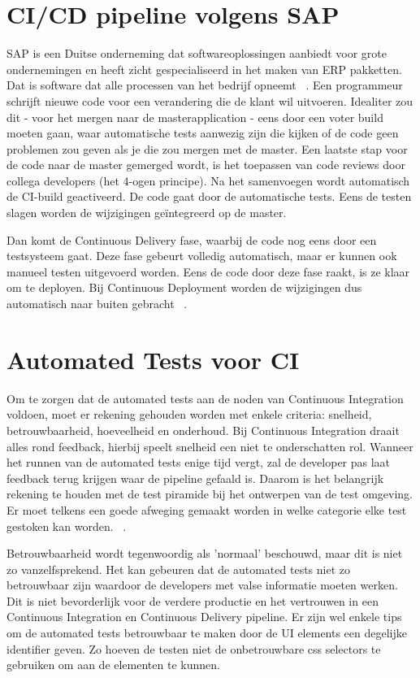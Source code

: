 \section{CI/CD pipeline volgens SAP}
\label{sec:ci-cd-pipeling-volgens-sap}
SAP is een Duitse onderneming dat softwareoplossingen aanbiedt voor grote ondernemingen en heeft zicht gespecialiseerd in het maken van ERP pakketten. Dat is software dat alle processen van het bedrijf opneemt ~\autocite{SAPERP2019}.
Een programmeur schrijft nieuwe code voor een verandering die de klant wil uitvoeren. Idealiter zou dit - voor het mergen naar de masterapplication - eens door een voter build moeten gaan, waar automatische tests aanwezig zijn die kijken of de code geen problemen zou geven als je die zou mergen met de master. Een laatste stap voor de code naar de master gemerged wordt, is het toepassen van code reviews door collega developers (het 4-ogen principe).
Na het samenvoegen wordt automatisch de CI-build geactiveerd. De code gaat door de automatische tests. Eens de testen slagen worden de wijzigingen geïntegreerd op de master. 

Dan komt de Continuous Delivery fase, waarbij de code nog eens door een testsysteem gaat. Deze fase gebeurt volledig automatisch, maar er kunnen ook manueel testen uitgevoerd worden. Eens de code door deze fase raakt, is ze klaar om te deployen. 
Bij Continuous Deployment worden de wijzigingen dus automatisch naar buiten gebracht ~\autocite{Kramer2018}.

\section{Automated Tests voor CI}
\label{sec:automated-test-voor-ci}
Om te zorgen dat de automated tests aan de noden van Continuous Integration voldoen, moet er rekening gehouden worden met enkele criteria: snelheid, betrouwbaarheid, hoeveelheid en onderhoud.
Bij Continuous Integration draait alles rond feedback, hierbij speelt snelheid een niet te onderschatten rol. Wanneer het runnen van de automated tests enige tijd vergt, zal de developer pas laat feedback terug krijgen waar de pipeline gefaald is. Daarom is het belangrijk rekening te houden met de test piramide bij het ontwerpen van de test omgeving. Er moet telkens een goede afweging gemaakt worden in welke categorie elke test gestoken kan worden.
~\autocite{Jones2019}.

Betrouwbaarheid wordt tegenwoordig als 'normaal' beschouwd, maar dit is niet zo vanzelfsprekend. Het kan gebeuren dat de automated tests niet zo betrouwbaar zijn waardoor de developers met valse informatie moeten werken. Dit is niet bevorderlijk voor de verdere productie en het vertrouwen in een Continuous Integration en Continuous Delivery pipeline. Er zijn wel enkele tips om de automated tests betrouwbaar te maken door de UI elements een degelijke identifier geven. Zo hoeven de testen niet de onbetrouwbare css selectors te gebruiken om aan de elementen te kunnen. 

